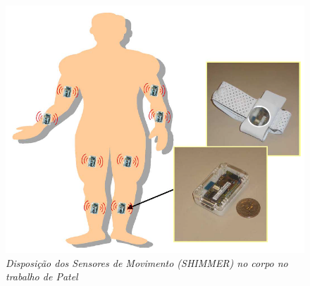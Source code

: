 \begin{figure}
 \centering
 \includegraphics[scale=0.3]{./img/patel-shimmer.png}
\caption[Disposição dos Sensores de Movimento (SHIMMER) no corpo no trabalho de Patel]{\textit{Disposição dos Sensores de Movimento (SHIMMER) no corpo no trabalho de Patel ~\cite{patel_monitoring_2009}}}
 \label{fig:patel-shimmer}
\end{figure}

